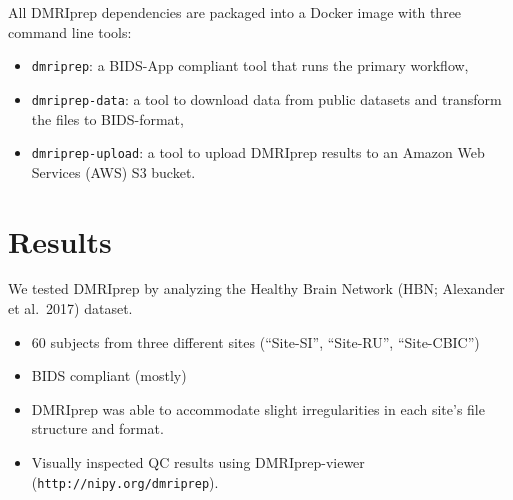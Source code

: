 \documentclass[a0, landscape]{a0poster}
\begin{document}
\begin{multicols}{3}
\vfill
\columnbreak

\noindent All DMRIprep dependencies are packaged into a Docker image with three command line tools:
\begin{itemize}
    \item \texttt{dmriprep}: a BIDS-App compliant tool that runs the primary workflow,
    \item \texttt{dmriprep-data}: a tool to download data from public datasets and transform the files to BIDS-format,
    \item \texttt{dmriprep-upload}: a tool to upload DMRIprep results to an Amazon Web Services (AWS) S3 bucket.
\end{itemize}

\color{Navy}


\section*{Results}

\noindent We tested DMRIprep by analyzing the Healthy Brain Network (HBN; Alexander et al.~2017) dataset.
\begin{itemize}
    \item 60 subjects from three different sites (``Site-SI'', ``Site-RU'', ``Site-CBIC'')
    \item BIDS compliant (mostly)
    \item DMRIprep was able to accommodate slight irregularities in each site's file structure and format.
    \item Visually inspected QC results using DMRIprep-viewer (\texttt{http://nipy.org/dmriprep}).
\end{itemize}


\end{multicols}
\end{document}
